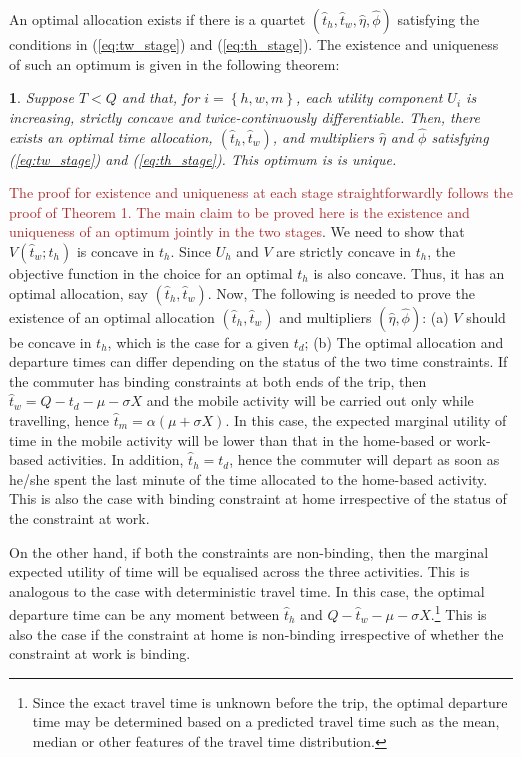 \documentclass[12pt,a4paper,british]{article}
\makeatletter
\theoremstyle{definition}
\theoremstyle{plain}
\newtheorem{thm}{\protect\theoremname}
\newenvironment{proof}[1][\proofname]{\par
    \normalfont\topsep6\p@\@plus6\p@\relax
    \trivlist
    \itemindent\parindent
    \item[\hskip\labelsep
          \scshape
      #1]\ignorespaces
  }{%
    \endtrivlist\@endpefalse
  }
\providecommand{\proofname}{Proof}
\theoremstyle{plain}
\providecommand{\theoremname}{Theorem}
\makeatother
\begin{document}
An optimal allocation exists if there is a quartet $\left(\hat{t}_{h},\hat{t}_{w},\hat{\eta},\hat{\phi}\right)$
satisfying the conditions in (\ref{eq:tw_stage}) and (\ref{eq:th_stage}).
The existence and uniqueness of such an optimum is given in the following
theorem:
\begin{thm}
\label{thm:existence_stochastic}Suppose $T<Q$ and that, for $i=\left\{ h,w,m\right\} $,
each utility component $U_{i}$ is increasing, strictly concave and
twice-continuously differentiable. Then, there exists an optimal time
allocation, $\left(\hat{t}_{h},\hat{t}_{w}\right)$, and multipliers
$\hat{\eta}$ and $\hat{\phi}$ satisfying (\ref{eq:tw_stage}) and
(\ref{eq:th_stage}). This optimum is is unique.
\end{thm}
\begin{proof}
\textcolor{brown}{The proof for existence and uniqueness at each stage
straightforwardly follows the proof of Theorem 1. The main claim to
be proved here is the existence and uniqueness of an optimum jointly
in the two stages}. We need to show that $V\left(\hat{t}_{w};t_{h}\right)$
is concave in $t_{h}$. Since $U_{h}$ and $V$ are strictly concave
in $t_{h}$, the objective function in the choice for an optimal $t_{h}$
is also concave. Thus, it has an optimal allocation, say $\left(\hat{t}_{h},\hat{t}_{w}\right)$.
Now, The following is needed to prove the existence of an optimal
allocation $\left(\hat{t}_{h},\hat{t}_{w}\right)$ and multipliers
$\left(\hat{\eta},\hat{\phi}\right)$: (a) $V$ should be concave
in $t_{h}$, which is the case for a given $t_{d}$; (b)
\end{proof}
The optimal allocation and departure times can differ depending on
the status of the two time constraints. If the commuter has binding
constraints at both ends of the trip, then $\hat{t}_{w}=Q-t_{d}-\mu-\sigma X$
and the mobile activity will be carried out only while travelling,
hence $\hat{t}_{m}=\alpha\left(\mu+\sigma X\right)$. In this case,
the expected marginal utility of time in the mobile activity will
be lower than that in the home-based or work-based activities. In
addition, $\hat{t}_{h}=t_{d}$, hence the commuter will depart as
soon as he/she spent the last minute of the time allocated to the
home-based activity. This is also the case with binding constraint
at home irrespective of the status of the constraint at work.

On the other hand, if both the constraints are non-binding, then the
marginal expected utility of time will be equalised across the three
activities. This is analogous to the case with deterministic travel
time. In this case, the optimal departure time can be any moment between
$\hat{t}_{h}$ and $Q-\hat{t}_{w}-\mu-\sigma X$.\footnote{Since the exact travel time is unknown before the trip, the optimal
departure time may be determined based on a predicted travel time
such as the mean, median or other features of the travel time distribution.} This is also the case if the constraint at home is non-binding irrespective
of whether the constraint at work is binding. 
\end{document}
